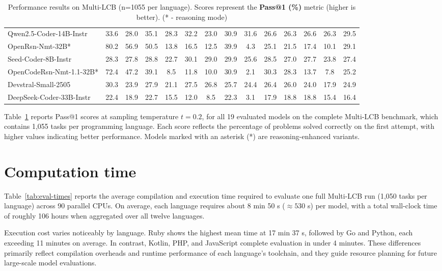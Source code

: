 \documentclass{llmxive}
\begin{document}
\begin{table}[hbt]
{\begin{tabular}{l *{13}{c}}
Qwen2.5-Coder-14B-Instr        & 33.6 & 28.0 & 35.1 & 28.3 & 32.2 & 23.0 & 30.9 & 31.6 & 26.6 & 26.3 & 26.6 & 26.3 & 29.5 \\
\rowcolor{gray!10}
OpenRsn-Nmt-32B*      & 80.2 & 56.9 & 50.5 & 13.8 & 16.5 & 12.5 & 39.9 & 4.3  & 25.1 & 21.5 & 17.4 & 10.1 & 29.1 \\
Seed-Coder-8B-Instr            & 28.3 & 27.8 & 28.8 & 22.7 & 30.1 & 29.0 & 29.9 & 25.6 & 28.5 & 27.0 & 27.7 & 23.8 & 27.4 \\
\rowcolor{gray!10}
OpenCodeRsn-Nmt-1.1-32B* & 72.4 & 47.2 & 39.1 & 8.5  & 11.8 & 10.0 & 30.9 & 2.1  & 30.3 & 28.3 & 13.7 & 7.8  & 25.2 \\
Devstral-Small-2505            & 30.3 & 23.9 & 27.9 & 21.1 & 27.5 & 26.8 & 25.7 & 24.4 & 26.4 & 26.0 & 24.0 & 17.9 & 24.9 \\
\rowcolor{gray!10}
DeepSeek-Coder-33B-Instr       & 22.4 & 18.9 & 22.7 & 15.5 & 12.0 & 8.5  & 22.3 & 3.1  & 17.9 & 18.8 & 18.8 & 15.4 & 16.4 \\
\bottomrule
\end{tabular}%
}
\caption{Performance results on Multi-LCB (n=1055 per language). 
Scores represent the \textbf{Pass@1 (\%)} metric (higher is better). (* - reasoning mode)}
\label{tab:multi_lcb_1055}
\end{table}


Table~\ref{tab:multi_lcb_1055} reports Pass@1 scores at sampling temperature $t = 0.2$, for all 19 evaluated models on the complete Multi-LCB benchmark, which contains 1,055 tasks per programming language. Each score reflects the percentage of problems solved correctly on the first attempt, with higher values indicating better performance. Models marked with an asterisk (*) are reasoning-enhanced variants.






\section{Computation time}

Table~\ref{tab:eval-times} reports the average compilation and execution time required to evaluate one full Multi-LCB run (1,050 tasks per language) across 90 parallel CPUs. On average, each language requires about 8 min 50 s ($\approx 530$ s) per model, with a total wall-clock time of roughly 106 hours when aggregated over all twelve languages.

Execution cost varies noticeably by language. Ruby shows the highest mean time at 17 min 37 s, followed by Go and Python, each exceeding 11 minutes on average. In contrast, Kotlin, PHP, and JavaScript complete evaluation in under 4 minutes. These differences primarily reflect compilation overheads and runtime performance of each language’s toolchain, and they guide resource planning for future large-scale model evaluations.
\end{document}
